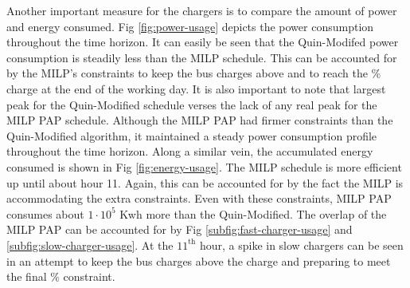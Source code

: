 Another important measure for the chargers is to compare the amount of power and energy consumed. Fig
\ref{fig:power-usage} depicts the power consumption throughout the time horizon. It can easily be seen that the
Quin-Modifed power consumption is steadily less than the MILP schedule. This can be accounted for by the MILP's
constraints to keep the bus charges above \mincharge and to reach the \% charge at the end of the
working day. It is also important to note that largest peak for the Quin-Modified schedule verses the lack of any real
peak for the MILP PAP schedule. Although the MILP PAP had firmer constraints than the Quin-Modified algorithm, it
maintained a steady power consumption profile throughout the time horizon. Along a similar vein, the accumulated energy
consumed is shown in Fig \ref{fig:energy-usage}. The MILP schedule is more efficient up until about hour 11. Again, this
can be accounted for by the fact the MILP is accommodating the extra constraints. Even with these constraints, MILP PAP
consumes about $1\cdot10^5$ Kwh more than the Quin-Modified. The overlap of the MILP PAP can be accounted for by Fig
\ref{subfig:fast-charger-usage} and \ref{subfig:slow-charger-usage}. At the $\text{11}^{\text{th}}$ hour, a spike in
slow chargers can be seen in an attempt to keep the bus charges above the \mincharge charge and preparing to meet the
final \% constraint.
